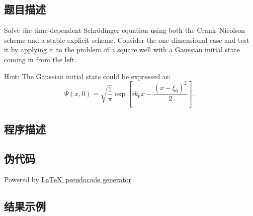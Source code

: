 \subsection{题目描述}
\noindent
Solve the time-dependent Schrödinger equation using both the Crank–Nicolson scheme and a stable explicit scheme. Consider the one-dimensional case and test it by applying it to the problem of a square well with a Gaussian initial state coming in from the left.

\noindent
Hint: The Gaussian initial state could be expressed as:
\[
    \Psi(x, 0) = \sqrt{\frac{1}{\pi}} \exp\left[ i k_0 x - \frac{(x - \xi_0)^2}{2} \right].
\]


\subsection{程序描述}

\subsection{伪代码}
Powered by \href{https://chatgpt.com/g/g-xJJAA2awf-latex-pseudocode-generator}{\LaTeX \ pseudocode generator}


\subsection{结果示例}
